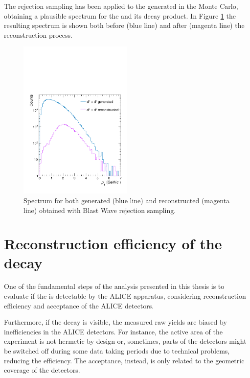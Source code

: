 The rejection sampling has been applied to the \ds generated in the Monte Carlo, obtaining a 
plausible \pt spectrum for the \ds and its decay product. In Figure \ref{fig:bw_spectrum} the
resulting \pt spectrum is shown both before (blue line) and after (magenta line) the reconstruction
process.

\begin{figure}
    \centering
    \includegraphics[width=0.5\textwidth]{gfx/genrecBW}
	\caption{Spectrum for both generated (blue line) and reconstructed (magenta line) \ds obtained with Blast Wave rejection sampling.}
	\label{fig:bw_spectrum}
\end{figure}

%
%
\section{Reconstruction efficiency of the \ds decay} \label{sec:eff}

One of the fundamental steps of the analysis presented in this thesis is to evaluate if the
\dstdecay is detectable by the ALICE apparatus, considering reconstruction efficiency and acceptance
of the ALICE detectors. 

Furthermore, if the decay is visible, the measured raw yields are biased by inefficiencies in the
ALICE detectors.
For instance, the active area of the experiment is not hermetic by design or, sometimes, parts of the
detectors might be switched off during some data taking periods due to technical problems, reducing
the efficiency.
The acceptance, instead, is only related to the geometric coverage of the detectors.


